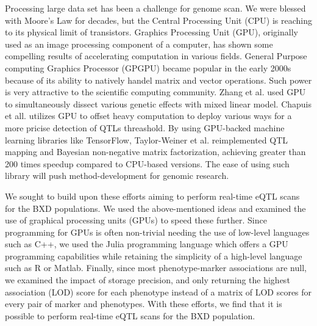 \documentclass[9pt,twocolumn,twoside,lineno]{gsag3jnl}
\begin{document}

Processing large data set has been a challenge for genome scan. 
We were blessed with Moore's Law for decades, but the Central Processing Unit (CPU) is reaching to its physical limit of transistors. 
Graphics Processing Unit (GPU), originally used as an image processing component of a computer, has shown some compelling results of accelerating computation in various fields.
General Purpose computing Graphics Processor (GPGPU) became popular in the early 2000s because of its ability to natively handel matrix and vector operations. 
Such power is very attractive to the scientific computing community. 
Zhang et al. \citep{zhang2015mixed} used GPU to simultaneously dissect various genetic effects with mixed linear model. 
Chapuis et all. \citep{chapuis2013graphics} utilizes GPU to offset heavy computation to deploy various ways for a more pricise detection of QTLs threashold. 
By using GPU-backed machine learning libraries like TensorFlow, Taylor-Weiner et al. \citep{taylor2019scaling} reimplemented QTL mapping  and Bayesian non-negative matrix factorization, achieving greater than 200 times speedup compared to CPU-based versions. 
The ease of using such library will push method-development for genomic research.



We sought to build upon these efforts aiming to perform real-time eQTL
scans for the BXD populations.  We used the above-mentioned ideas and
examined the use of graphical processing units (GPUs) to speed these
further.  Since programming for GPUs is often non-trivial needing the
use of low-level languages such as C++, we used the Julia programming
language which offers a GPU programming capabilities while retaining
the simplicity of a high-level language such as R or Matlab.  Finally,
since most phenotype-marker associations are null, we examined the
impact of storage precision, and only returning the highest
association (LOD) score for each phenotype instead of a matrix of LOD
scores for every pair of marker and phenotypes.  With these efforts,
we find that it is possible to perform real-time eQTL scans
for the BXD population.
\end{document}
